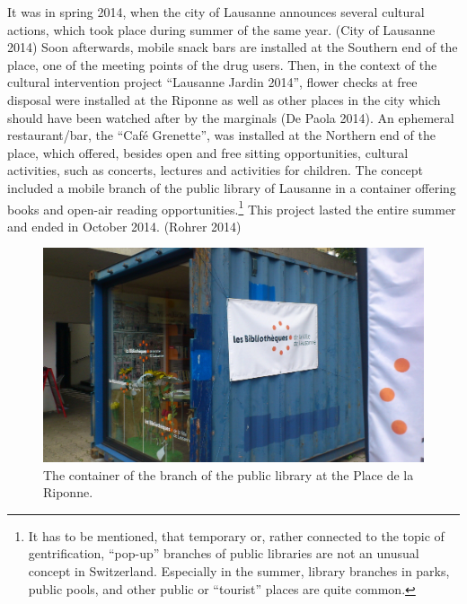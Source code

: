 \documentclass[a4paper,
fontsize=11pt,
oneside,
numbers=noperiodatend,
parskip=half-,
bibliography=totoc,
final
]{scrartcl}
\begin{document}
It was in spring 2014, when the city of Lausanne announces several
cultural actions, which took place during summer of the same year. (City
of Lausanne 2014) Soon afterwards, mobile snack bars are installed at
the Southern end of the place, one of the meeting points of the drug
users. Then, in the context of the cultural intervention project
\enquote{Lausanne Jardin 2014}, flower checks at free disposal were
installed at the Riponne as well as other places in the city which
should have been watched after by the marginals (De Paola 2014). An
ephemeral restaurant/bar, the \enquote{Café Grenette}, was installed at
the Northern end of the place, which offered, besides open and free
sitting opportunities, cultural activities, such as concerts, lectures
and activities for children. The concept included a mobile branch of the
public library of Lausanne in a container offering books and open-air
reading opportunities.\footnote{It has to be mentioned, that temporary
  or, rather connected to the topic of gentrification, \enquote{pop-up}
  branches of public libraries are not an unusual concept in
  Switzerland. Especially in the summer, library branches in parks,
  public pools, and other public or \enquote{tourist} places are quite
  common.} This project lasted the entire summer and ended in October
2014. (Rohrer 2014)

\begin{figure}[htbp]
\centering
\includegraphics{img/BlumerSchuldt03.jpg}
\caption{The container of the branch of the public library at the Place
de la Riponne.}
\end{figure}
\end{document}
